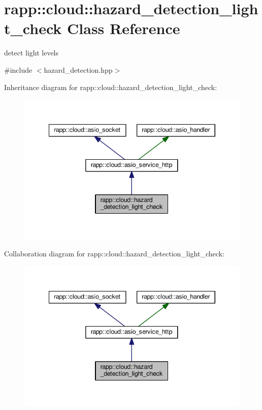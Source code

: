 \hypertarget{classrapp_1_1cloud_1_1hazard__detection__light__check}{\section{rapp\-:\-:cloud\-:\-:hazard\-\_\-detection\-\_\-light\-\_\-check Class Reference}
\label{classrapp_1_1cloud_1_1hazard__detection__light__check}
}


detect light levels  




{\ttfamily \#include $<$hazard\-\_\-detection.\-hpp$>$}



Inheritance diagram for rapp\-:\-:cloud\-:\-:hazard\-\_\-detection\-\_\-light\-\_\-check\-:
\nopagebreak
\begin{figure}[H]
\begin{center}
\leavevmode
\includegraphics[width=345pt]{classrapp_1_1cloud_1_1hazard__detection__light__check__inherit__graph}
\end{center}
\end{figure}


Collaboration diagram for rapp\-:\-:cloud\-:\-:hazard\-\_\-detection\-\_\-light\-\_\-check\-:
\nopagebreak
\begin{figure}[H]
\begin{center}
\leavevmode
\includegraphics[width=345pt]{classrapp_1_1cloud_1_1hazard__detection__light__check__coll__graph}
\end{center}
\end{figure}
